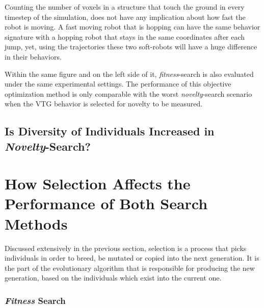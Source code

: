 Counting the number of voxels in a structure that touch the ground in every timestep of the simulation, does not have any implication about how fast the robot is moving. A fast moving robot that is hopping can have the same behavior signature with a hopping robot that stays in the same coordinates after each jump, yet, using the trajectories these two soft-robots will have a huge difference in their behaviors.

Within the same figure and on the left side of it, \emph{fitness}-search is also evaluated under the same experimental settings. The performance of this objective optimization method is only comparable with the worst \emph{novelty}-search scenario when the VTG behavior is selected for novelty to be measured.

\subsection{Is Diversity of Individuals Increased in \emph{Novelty}-Search?}



\section{How Selection Affects the Performance of Both Search Methods}

Discussed extensively in the previous section, selection is a process that picks individuals in order to breed, be mutated or copied into the next generation. It is the part of the evolutionary algorithm that is responsible for producing the new generation, based on the individuals which exist into the current one. 


\subsubsection*{\emph{Fitness} Search}

